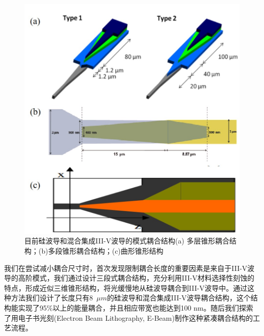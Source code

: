 \begin{figure}[htb]
	\centering
	\includegraphics[width=12cm]{./Pictures/fig_ch3_background_str.jpg}
	\caption{ 目前硅波导和混合集成III-V波导的模式耦合结构(a) 多层锥形耦合结构\cite{kurczveil2013characterization}；(b)多段锥形耦合结构\cite{keyvaninia2009engineering}；(c)曲形锥形结构\cite{wang2012heterogeneous}}
	\label{fig_ch3_background_str}
\end{figure}

我们在尝试减小耦合尺寸时，首次发现限制耦合长度的重要因素是来自于III-V波导的高阶模式，我们通过设计三段式耦合结构，充分利用III-V材料选择性刻蚀的特点，形成近似三维锥形结构，将光缓慢地从硅波导耦合到III-V波导中。通过这种方法我们设计了长度只有8~$\mu m$的硅波导和混合集成III-V波导耦合结构，这个结构能实现了95\%以上的能量耦合，并且相应带宽也能达到100 nm。随后我们探索了用电子书光刻(Electron Beam Lithography, E-Beam)制作这种紧凑耦合结构的工艺流程。
